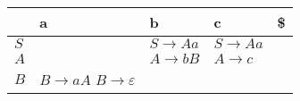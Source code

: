 \documentclass{standalone}
\providecommand\lightrule{%
	\arrayrulecolor{black!30}%
	\midrule[\lightrulewidth]%
	\arrayrulecolor{black}}
\begin{document}
\begin{tabularx}{\textwidth}{XXXXX}
     & a & b & c & \$ \\
    \midrule
        \(S\)
        &
        
        &
        \(S \rightarrow Aa\)
        &
        \(S \rightarrow Aa\)
        &
        \\ \lightrule
        \(A\)
        &
        
        &
        \(A \rightarrow bB\)
        &
        \(A \rightarrow c\)
        &
        \\ \lightrule
        \(B\)
        &
        \(B \rightarrow aA\)
        \newline
        \(B \rightarrow \varepsilon\)
        &
        
        &
        
        &
\end{tabularx}
\end{document}
